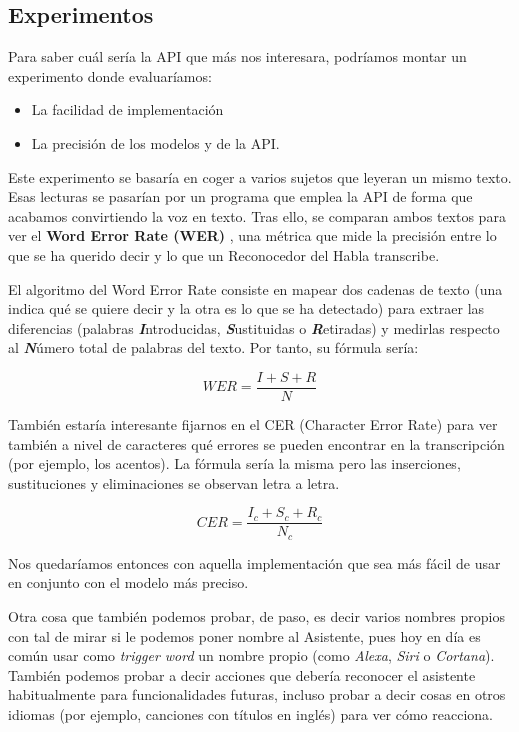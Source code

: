\subsection{Experimentos}

Para saber cuál sería la API que más nos interesara, podríamos montar un experimento donde evaluaríamos:
\begin{itemize}
	\item La facilidad de implementación
	\item La precisión de los modelos y de la API.
\end{itemize}

Este experimento se basaría en coger a varios sujetos que leyeran un mismo texto.
Esas lecturas se pasarían por un programa que emplea la API de forma que acabamos convirtiendo la voz en texto. Tras ello, se comparan ambos textos para ver el \textbf{Word Error Rate (WER)} \cite{wer-cer}, una métrica que mide la precisión entre lo que se ha querido decir y lo que un Reconocedor del Habla transcribe. 

El algoritmo del Word Error Rate consiste en mapear dos cadenas de texto (una indica qué se quiere decir y la otra es lo que se ha detectado) para extraer las diferencias (palabras \textbf{\textit{I}}ntroducidas, \textbf{\textit{S}}ustituidas o \textbf{\textit{R}}etiradas)  y medirlas respecto al \textbf{\textit{N}}úmero total de palabras del texto. Por tanto, su fórmula sería:

\begin{equation}
	WER = \frac{I+S+R}{N}
\end{equation}

También estaría interesante fijarnos en el CER (Character Error Rate) \cite{wer-cer} para ver también a nivel de caracteres qué errores se pueden encontrar en la transcripción (por ejemplo, los acentos). La fórmula sería la misma pero las inserciones, sustituciones y eliminaciones se observan letra a letra.

\begin{equation}
	CER = \frac{I_c+S_c+R_c}{N_c}
\end{equation}

Nos quedaríamos entonces con aquella implementación que sea más fácil de usar en conjunto con el modelo más preciso. 

Otra cosa que también podemos probar, de paso, es decir varios nombres propios con tal de mirar si le podemos poner nombre al Asistente, pues hoy en día es común usar como \textit{trigger word} un nombre propio (como \textit{Alexa}, \textit{Siri} o \textit{Cortana}). También podemos probar a decir acciones que debería reconocer el asistente habitualmente para funcionalidades futuras, incluso probar a decir cosas en otros idiomas (por ejemplo, canciones con títulos en inglés) para ver cómo reacciona.

